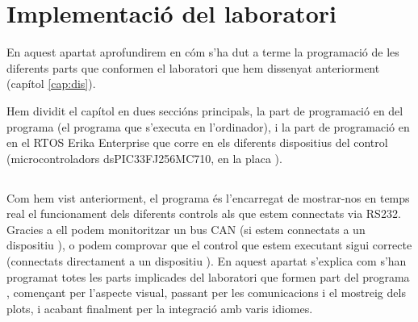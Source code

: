 
\chapter{Implementació del laboratori}\label{cap:imp}


\ifpdf
    \graphicspath{{4_laboratory_implement/figures/PNG/}{4_laboratory_implement/figures/PDF/}{4_laboratory_implement/figures/}}
\else
    \graphicspath{{4_laboratory_implement/figures/EPS/}{4_laboratory_implement/figures/}}
\fi



En aquest apartat aprofundirem en cóm s'ha dut a terme la programació de les diferents parts que conformen el laboratori que hem dissenyat anteriorment (capítol \ref{cap:dis}).

Hem dividit el capítol en dues seccións principals, la part de programació en \Python del programa \DCSMonitor (el programa que s'executa en l'ordinador), i la part de programació en \C en el RTOS Erika Enterprise que corre en els diferents dispositius del control (microcontroladors dsPIC33FJ256MC710, en la placa \FLEX).

\section{\DCSMonitor}\label{cap:imp:dcs}

Com hem vist anteriorment, el programa \DCSMonitor és l'encarregat de mostrar-nos en temps real el funcionament dels diferents controls als que estem connectats via RS232.
Gracies a ell podem monitoritzar un bus CAN (si estem connectats a un dispositiu \Monitor), o podem comprovar que el control que estem executant sigui correcte (connectats directament a un dispositiu \SensorActuador).
En aquest apartat s'explica com s'han programat totes les parts implicades del laboratori que formen part del programa \DCSMonitor, començant per l'aspecte visual, passant per les comunicacions i el mostreig dels plots, i acabant finalment per la integració amb varis idiomes.


